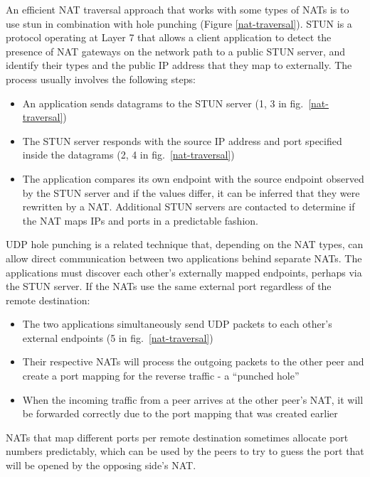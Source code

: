 
An efficient NAT traversal approach that works with some types of NATs
is to use \gls{stun} \autocite{stunRFC} in combination with 
hole punching (Figure \ref{nat-traversal}). STUN is a protocol operating
at Layer 7 that allows a client application to detect the presence of
NAT gateways on the network path to a public STUN server, and identify
their types and the public IP address that they map to externally. The
process usually involves the following steps:

\begin{itemize}
\tightlist
\item
  An application sends  datagrams to the STUN server (1, 3 in
  fig.~\ref{nat-traversal})
\item
  The STUN server responds with the source IP address and port specified
  inside the datagrams (2, 4 in fig.~\ref{nat-traversal})
\item
  The application compares its own endpoint with the source endpoint
  observed by the STUN server and if the values differ, it can be
  inferred that they were rewritten by a NAT. Additional STUN servers
  are contacted to determine if the NAT maps IPs and ports in a
  predictable fashion.
\end{itemize}

UDP hole punching is a related technique that, depending on the NAT
types, can allow direct communication between two applications behind
separate NATs. The applications must discover each other's externally
mapped endpoints, perhaps via the STUN server.  If the
NATs use the same external port regardless of the remote destination:

\begin{itemize}
\tightlist
\item
  The two applications simultaneously send UDP packets to each other's
  external endpoints (5 in fig.~\ref{nat-traversal})
\item
  Their respective NATs will process the outgoing packets to the other
  peer and create a port mapping for the reverse traffic - a ``punched
  hole''
\item
  When the incoming traffic from a peer arrives at the other peer's NAT,
  it will be forwarded correctly due to the port mapping that was
  created earlier
\end{itemize}

NATs that map different ports per remote destination sometimes allocate
port numbers predictably, which can be used by the peers to try to guess
the port that will be opened by the opposing side's NAT.

